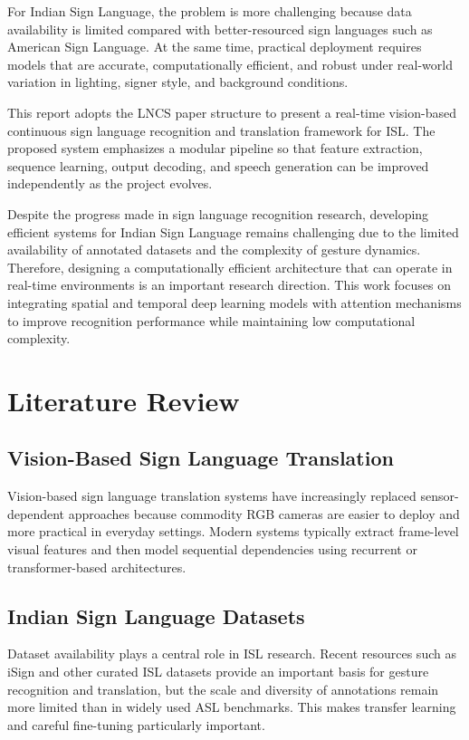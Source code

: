 \documentclass[runningheads]{llncs}
\begin{document}
For Indian Sign Language, the problem is more challenging because data availability is limited compared with better-resourced sign languages such as American Sign Language. At the same time, practical deployment requires models that are accurate, computationally efficient, and robust under real-world variation in lighting, signer style, and background conditions.

This report adopts the LNCS paper structure to present a real-time vision-based continuous sign language recognition and translation framework for ISL. The proposed system emphasizes a modular pipeline so that feature extraction, sequence learning, output decoding, and speech generation can be improved independently as the project evolves.

Despite the progress made in sign language recognition research, developing efficient systems for Indian Sign Language remains challenging due to the limited availability of annotated datasets and the complexity of gesture dynamics. Therefore, designing a computationally efficient architecture that can operate in real-time environments is an important research direction. This work focuses on integrating spatial and temporal deep learning models with attention mechanisms to improve recognition performance while maintaining low computational complexity.

\section{Literature Review}
\subsection{Vision-Based Sign Language Translation}
Vision-based sign language translation systems have increasingly replaced sensor-dependent approaches because commodity RGB cameras are easier to deploy and more practical in everyday settings. Modern systems typically extract frame-level visual features and then model sequential dependencies using recurrent or transformer-based architectures.

\subsection{Indian Sign Language Datasets}
Dataset availability plays a central role in ISL research. Recent resources such as iSign and other curated ISL datasets provide an important basis for gesture recognition and translation, but the scale and diversity of annotations remain more limited than in widely used ASL benchmarks. This makes transfer learning and careful fine-tuning particularly important.
\end{document}
